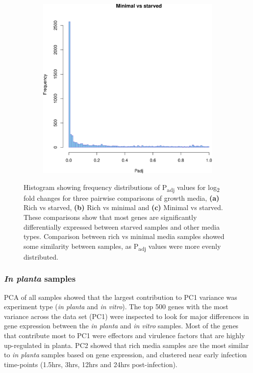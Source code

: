 \begin{figure}[H]
\begin{subfigure}{0.5\textwidth}
\includegraphics[width=0.9\linewidth]{psa/hist_minimal_starved.png}
\end{subfigure}
\begin{minipage}[c]{0.49\textwidth}
\caption[Frequency distributions of P\textsubscript{adj} values for log\textsubscript{2} fold changes for \textit{in vitro} growth media comparisons]{Histogram showing frequency distributions of P\textsubscript{adj} values for log\textsubscript{2} fold changes for three pairwise comparisons of growth media, \textbf{(a)} Rich vs starved, \textbf{(b)} Rich vs minimal and \textbf{(c)} Minimal vs starved. These comparisons show that most genes are significantly differentially expressed between starved samples and other media types. Comparison between rich vs minimal media samples showed some similarity between samples, as P\textsubscript{adj} values were more evenly distributed.}
\label{fig:hist_media}
  \end{minipage}
\end{figure}

\subsubsection{\textit{In planta} samples}

PCA of all samples showed that the largest contribution to PC1 variance was experiment type (\textit{in planta} and \textit{in vitro}). The top 500 genes with the most variance across the data set (PC1) were inspected to look for major differences in gene expression between the \textit{in planta} and \textit{in vitro} samples. Most of the genes that contribute most to PC1 were effectors and virulence factors that are highly up-regulated in planta. PC2 showed that rich media samples are the most similar to \textit{in planta} samples based on gene expression, and clustered near early infection time-points (1.5hrs, 3hrs, 12hrs and 24hrs post-infection). 

